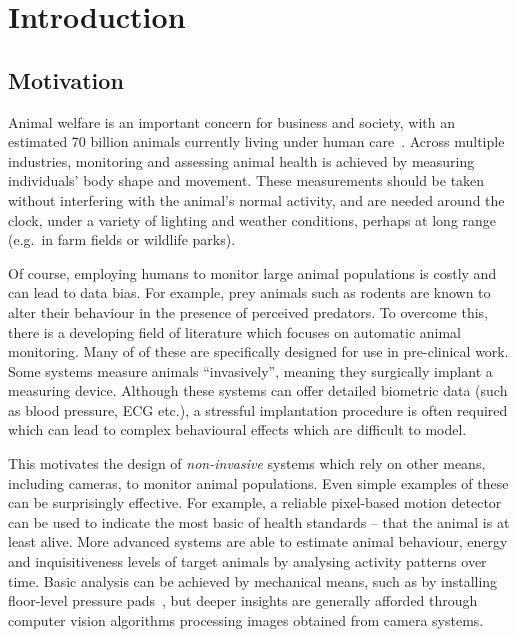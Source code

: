 
\chapter{Introduction}\label{chap:intro}  %

\ifpdf
    \graphicspath{{Chapter1/Figs/Raster/}{Chapter1/Figs/PDF/}{Chapter1/Figs/}}
\else
    \graphicspath{{Chapter1/Figs/Vector/}{Chapter1/Figs/}}
\fi


\section{Motivation} %

Animal welfare is an important concern for business and society, with an estimated 70 billion animals currently living under human care~\cite{FAOSTAT}. Across multiple industries, monitoring and assessing animal health is achieved by measuring individuals' body shape and movement. These measurements should be taken without interfering with the animal's normal activity, and are needed around the clock, under a variety of lighting and weather conditions, perhaps at long range (e.g.\ in farm fields or wildlife parks). 

Of course, employing humans to monitor large animal populations is costly and can lead to data bias. For example, prey animals such as rodents are known to alter their behaviour in the presence of perceived predators. To overcome this, there is a developing field of literature which focuses on automatic animal monitoring. Many of of these are specifically designed for use in pre-clinical work. Some systems measure animals ``invasively'', meaning they surgically implant a measuring device. Although these systems can offer detailed biometric data (such as blood pressure, ECG etc.), a stressful implantation procedure is often required which can lead to complex behavioural effects which are difficult to model.

This motivates the design of \emph{non-invasive} systems which rely on other means, including cameras, to monitor animal populations. Even simple examples of these can be surprisingly effective. For example, a reliable pixel-based motion detector can be used to indicate the most basic of health standards -- that the animal is at least alive. More advanced systems are able to estimate animal behaviour, energy and inquisitiveness levels of target animals by analysing activity patterns over time. Basic analysis can be achieved by mechanical means, such as by installing floor-level pressure pads~\cite{zammit2010reliability}, but deeper insights are generally afforded through computer vision algorithms processing images obtained from camera systems.

